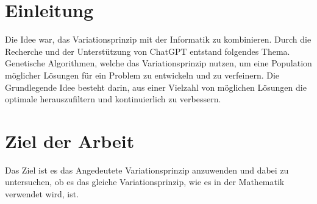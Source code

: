 %
%
%
%
\section{Einleitung}
Die Idee war, das Variationsprinzip mit der Informatik zu kombinieren. 
Durch die Recherche und der Unterstützung von ChatGPT entstand folgendes Thema.
Genetische Algorithmen, welche das Variationsprinzip nutzen, um eine Population 
möglicher Lösungen für ein Problem zu entwickeln und zu verfeinern. 
Die Grundlegende Idee besteht darin, aus einer Vielzahl von möglichen Lösungen 
die optimale herauszufiltern und kontinuierlich zu verbessern.

\section{Ziel der Arbeit}
Das Ziel ist es das Angedeutete Variationsprinzip anzuwenden und dabei zu untersuchen, 
ob es das gleiche Variationsprinzip, wie es in der Mathematik verwendet wird, ist.
